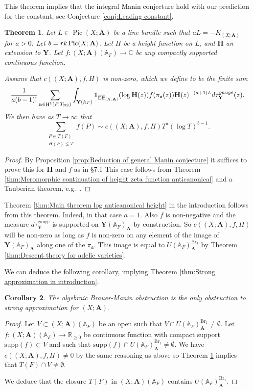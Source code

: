 \documentclass[a4paper,11pt,reqno]{amsart}
\newcommand{\R}{\mathbb{R}}
\newcommand{\C}{\mathbb{C}}
\newcommand{\A}{\mathbb{A}}
\DeclareMathOperator{\Pic}{Pic}
\DeclareMathOperator{\NS}{NS}
\DeclareMathOperator{\Eff}{\overline{Eff}}
\DeclareMathOperator{\Br}{Br}
\DeclareMathOperator{\HH}{H}
\newtheorem{theorem}{Theorem}[section]
\newtheorem{corollary}[theorem]{Corollary}
\theoremstyle{definition}
\begin{document}
This theorem implies that the integral Manin conjecture hold with our prediction for the constant, see Conjecture \ref{conj:Leading constant}.
\begin{theorem}\label{thm:Main theorem anticanonical case}
	Let $L \in \Pic(X ; \mathbf{A})$ be a line bundle such that $aL = - K_{(X ; \mathbf{A})}$ for $a > 0$. Let $b = \emph{rk} \Pic (X ; \mathbf{A})$. Let $H$ be a height function on $L$, and $\mathbf{H}$ an extension to $\mathbf{Y}$. Let $f: (X ; \mathbf{A})(\A_F) \to \C$ be any compactly supported continuous function.
	
	Assume that $c((X ; \mathbf{A}), f , H)$ is non-zero, which we define to be the finite sum
	\[
	\frac{1}{a (b - 1)!}\sum_{\mathbf{a} \in \HH^1(F, T_{\NS})} \int_{\mathbf{Y}(\A_F)} \mathbf{1}_{\Eff_{(X ; \mathbf{A})}}(\log \mathbf{H}(z)) f(\pi_{\mathfrak{a}}(z)) \mathbf{H}(z)^{- (a + 1)L} d\tau_{\mathbf{Y}}^{\emph{gauge}}(z).
	\]
	We then have as $T \to \infty$ that 
	\[\sum_{\substack{P \in T(F) \\ H(P) \leq T}} f(P) \sim c((X ; \mathbf{A}), f , H) T^a (\log T)^{b - 1}.\]
\end{theorem}
\begin{proof}
	By Proposition \ref{prop:Reduction of general Manin conjecture} it suffices to prove this for $\mathbf{H}$ and $f$ as in \S7.1 This case follows from Theorem \ref{thm:Meromorphic continuation of height zeta function anticanonical} and a Tauberian theorem, e.g.~\cite[Thm.~II.7.13]{Tenenbaum2015Analytic}.
\end{proof}

Theorem \ref{thm:Main theorem log anticanonical height} in the introduction follows from this theorem. Indeed, in that case $a = 1$. Also $f$ is non-negative and the measure $d\tau_{\mathbf{Y}}^{\text{gauge}}$ is supported on $\mathbf{Y}(\A_F)_{\mathbf{A}}$ by construction. So $c((X ; \mathbf{A}), f , H)$ will be non-zero as long as $f$ is non-zero on any element of the image of $\mathbf{Y}(\A_F)_{\mathbf{A}}$ along one of the $\pi_{\mathfrak{a}}$. This image is equal to $U(\A_F)_{\mathbf{A}}^{\Br_1}$ by Theorem \ref{thm:Descent theory for adelic varieties}.
	
We can deduce the following corollary, implying Theorem \ref{thm:Strong approximation in introduction}.
\begin{corollary}
	The algebraic Brauer-Manin obstruction is the only obstruction to strong approximation for $(X; \mathbf{A})$.
\end{corollary}
\begin{proof}
	Let $V \subset (X ; \mathbf{A})(\A_F)$ be an open such that $V \cap U(\A_F)_{\mathbf{A}}^{\Br_1} \neq \emptyset$. Let $f: (X ; \mathbf{A})(\A_F) \to \R_{\geq 0}$ be continuous function with compact support $\text{supp}(f) \subset V$ and such that $\text{supp}(f) \cap U(\A_F)_{\mathbf{A}}^{\Br_1} \neq \emptyset$. We have $c((X ; \mathbf{A}), f , H) \neq 0$ by the same reasoning as above so Theorem \ref{thm:Main theorem anticanonical case} implies that $T(F) \cap V \neq \emptyset$.
	
	 We deduce that the closure $\overline{T(F)}$ in $(X ; \mathbf{A})(\A_F)$ contains $U(\A_F)_{\mathbf{A}}^{\Br_1}$.
\end{proof}
\end{document}
